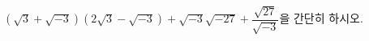 $(\sqrt{3}+\sqrt{-3})(2\sqrt{3}-\sqrt{-3})+\sqrt{-3}\sqrt{-27}+\dfrac{\sqrt{27}}{\sqrt{-3}}$을 간단히 하시오.
